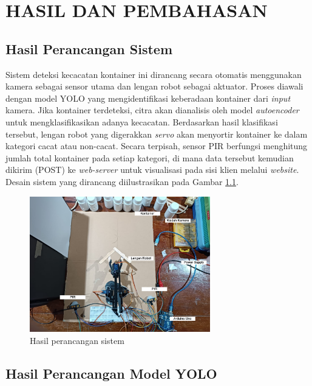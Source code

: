 \chapter{HASIL DAN PEMBAHASAN}
\section{Hasil Perancangan Sistem}
Sistem deteksi kecacatan kontainer ini dirancang secara otomatis
menggunakan kamera sebagai sensor utama dan lengan robot sebagai
aktuator. Proses diawali dengan model YOLO yang mengidentifikasi
keberadaan kontainer dari \textit{input} kamera. Jika kontainer terdeteksi,
citra akan dianalisis oleh model \textit{autoencoder} untuk mengklasifikasikan
adanya kecacatan. Berdasarkan hasil klasifikasi tersebut, lengan
robot yang digerakkan \textit{servo} akan menyortir kontainer ke dalam
kategori cacat atau non-cacat. Secara terpisah, sensor PIR berfungsi
menghitung jumlah total
kontainer pada setiap kategori, di mana data tersebut kemudian
dikirim (POST) ke \textit{web-server} untuk visualisasi pada sisi
klien melalui \textit{website}. Desain
sistem yang dirancang diilustrasikan pada Gambar \ref{fig:rancang-sistem}.

\begin{figure}[H]
  \centering
  \includegraphics[width=0.7\textwidth]{gambar/rancang_sistem.jpg}
  \caption{Hasil perancangan sistem}
  \label{fig:rancang-sistem}
\end{figure}
\vspace{-1em}

\vspace{1em}

\section{Hasil Perancangan Model YOLO}
